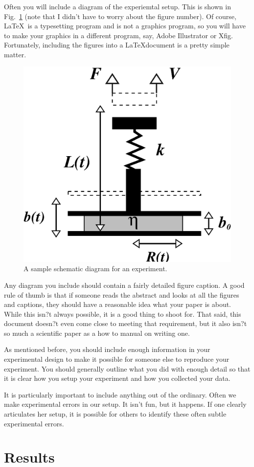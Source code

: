 \documentclass[preprint,pre,floats,aps,amsmath,amssymb]{revtex4}
\begin{document}
Often you will include a diagram of the experiemtal setup. This is shown in Fig.~\ref{fig:geometry} (note that I didn't have to worry about the figure number). Of course, \LaTeX\ is a typesetting program and is not a graphics program, so you will have to make your graphics in a different program, say, Adobe Illustrator or Xfig. Fortunately, including the figures into a \LaTeX document is a pretty simple matter.

\begin{figure}[ht]
\includegraphics[width=2.8 in]{geometry.eps}
\caption{A sample schematic diagram for an experiment.}
\label{fig:geometry}
\end{figure}

Any diagram you include should contain a fairly detailed figure caption. A good rule of thumb is that if someone reads the abstract and looks at all the figures and captions, they should have a reasonable idea what your paper is about. While this isn?t always possible, it is a good thing to shoot for. That said, this document doesn?t even come close to meeting that requirement, but it also isn?t so much a scientific paper as a how to manual on writing one.

As mentioned before, you should include enough information in your experimental design to make it possible for someone else to reproduce your experiment. You should generally outline what you did with enough detail so that it is clear how you setup your experiment and how you collected your data.

It is particularly important to include anything out of the ordinary. Often we make experimental errors in our setup. It isn't fun, but it happens. If one clearly articulates her setup, it is possible for others to identify these often subtle experimental errors.

\section{Results}
\label{sec:results}
\end{document}
